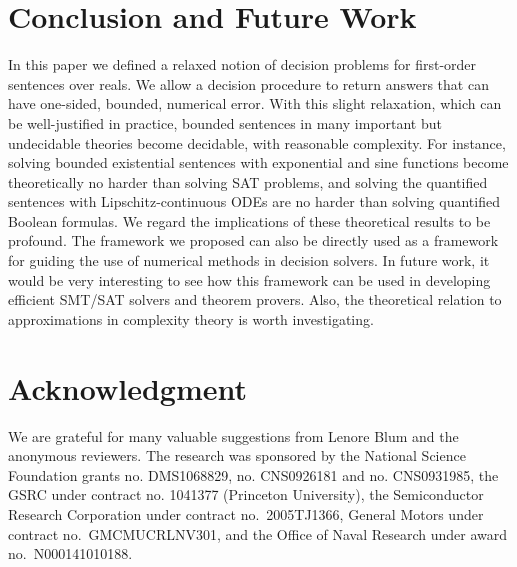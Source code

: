 \documentclass[conference]{IEEEtran}
\begin{document}
\section{Conclusion and Future Work}\label{conclude}

In this paper we defined a relaxed notion of decision problems for first-order sentences over reals. We allow a decision procedure to return answers that can have one-sided, bounded, numerical error. With this slight relaxation, which can be well-justified in practice, bounded sentences in many important but undecidable theories become decidable, with reasonable complexity. For instance, solving bounded existential sentences with exponential and sine functions become theoretically no harder than solving SAT problems, and solving the quantified sentences with Lipschitz-continuous ODEs are no harder than solving quantified Boolean formulas. We regard the implications of these theoretical results to be profound. The framework we proposed can also be directly used as a framework for guiding the use of numerical methods in decision solvers. In future work, it would be very interesting to see how this framework can be used in developing efficient SMT/SAT solvers and theorem provers. Also, the theoretical relation to approximations in complexity theory is worth investigating.

\section*{Acknowledgment}

We are grateful for many valuable suggestions from Lenore Blum and the anonymous reviewers. The research was sponsored by the National Science Foundation grants no. DMS1068829, no. CNS0926181 and no. CNS0931985, the GSRC under contract no. 1041377 (Princeton University), the Semiconductor Research Corporation under contract no.~2005TJ1366, General Motors under contract no.~GMCMUCRLNV301, and the Office of Naval Research under award no.~N000141010188.



\newpage
\end{document}
